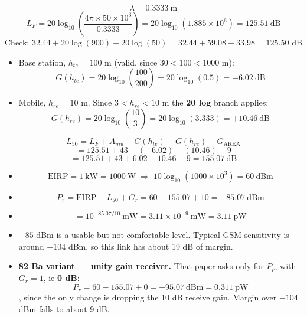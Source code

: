 \[ \lambda = 0.3333\ \text{m} \]
\[ L_F = 20\log_{10}\!\left(\frac{4\pi \times 50\times10^{3}}{0.3333}\right)
       = 20\log_{10}(1.885\times10^{6}) = 125.51\ \text{dB} \]
{\color{sub}\footnotesize Check: $32.44 + 20\log(900) + 20\log(50) = 32.44 + 59.08 + 33.98
= 125.50$ dB \checkmark}

\begin{itemize}
  \item Base station, $h_{te} = 100$ m (valid, since $30 < 100 < 1000$ m):
        \[ G(h_{te}) = 20\log_{10}\!\left(\frac{100}{200}\right) = 20\log_{10}(0.5)
                     = -6.02\ \text{dB} \]
  \item Mobile, $h_{re} = 10$ m. Since $3 < h_{re} < 10$ m the \textbf{20 log} branch applies:
        \[ G(h_{re}) = 20\log_{10}\!\left(\frac{10}{3}\right) = 20\log_{10}(3.333)
                     = +10.46\ \text{dB} \]
\end{itemize}

\[ L_{50} = L_F + A_{mu} - G(h_{te}) - G(h_{re}) - G_{\text{AREA}} \]
\[ = 125.51 + 43 - (-6.02) - (10.46) - 9 \]
\[ = 125.51 + 43 + 6.02 - 10.46 - 9 = \boxed{155.07\ \text{dB}} \]

\begin{itemize}
  \item \[ \text{EIRP} = 1\ \text{kW} = 1000\ \text{W}
        \;\Rightarrow\; 10\log_{10}(1000 \times 10^{3}) = \boxed{60\ \text{dBm}} \]
  \item \[ P_r = \text{EIRP} - L_{50} + G_r = 60 - 155.07 + 10 = \boxed{-85.07\ \text{dBm}} \]
  \item \[ = 10^{-85.07/10}\ \text{mW} = 3.11\times10^{-9}\ \text{mW} = 3.11\ \text{pW} \]
  \item {} $-85$ dBm is a usable but not comfortable level. Typical GSM
        sensitivity is around $-104$ dBm, so this link has about 19 dB of margin.
  \item \textbf{82 Ba variant --- unity gain receiver.} That paper asks only for $P_r$, with
        $G_r = 1$, ie \textbf{0 dB}:
        \[ P_r = 60 - 155.07 + 0 = \boxed{-95.07\ \text{dBm}} = 0.311\ \text{pW} \]
        , since the only change is dropping
        the 10 dB receive gain. Margin over $-104$ dBm falls to about 9 dB.
\end{itemize}

